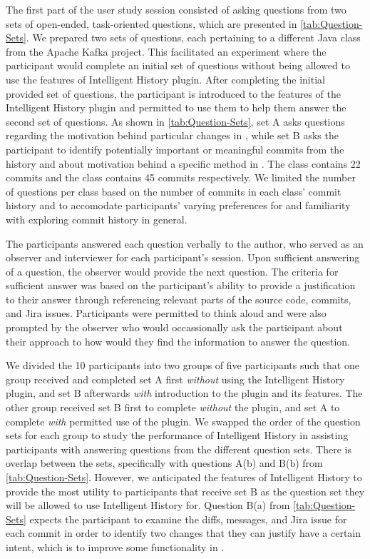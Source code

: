 The first part of the user study session consisted of asking questions from two sets of open-ended, task-oriented questions, which are presented in \autoref{tab:Question-Sets}.
We prepared two sets of questions, each pertaining to a different Java class from the Apache Kafka project.
This facilitated an experiment where the participant would complete an initial set of questions without being allowed to use the features of Intelligent History plugin.
After completing the initial provided set of questions, the participant is introduced to the features of the Intelligent History plugin and permitted to use them to help them answer the second set of questions.
As shown in \autoref{tab:Question-Sets}, set A asks questions regarding the motivation behind particular changes in , while set B asks the participant to identify potentially important or meaningful commits from the history and about motivation behind a specific method in .
The  class contains 22 commits and the  class contains 45 commits respectively.
We limited the number of questions per class based on the number of commits in each class' commit history and to accomodate participants' varying preferences for and familiarity with exploring commit history in general.

The participants answered each question verbally to the author, who served as an observer and interviewer for each participant's session.
Upon sufficient answering of a question, the observer would provide the next question.
The criteria for sufficient answer was based on the participant's ability to provide a justification to their answer through referencing relevant parts of the source code, commits, and Jira issues.
Participants were permitted to think aloud and were also prompted by the observer who would occassionally ask the participant about their approach to how would they find the information to answer the question.

We divided the 10 participants into two groups of five participants such that one group received and completed set A first \emph{without} using the Intelligent History plugin, and set B afterwards \emph{with} introduction to the plugin and its features.
The other group received set B first to complete \emph{without} the plugin, and set A to complete \emph{with} permitted use of the plugin.
We swapped the order of the question sets for each group to study the performance of Intelligent History in assisting participants with answering questions from the different question sets.
There is overlap between the sets, specifically with questions A(b) and B(b) from \autoref{tab:Question-Sets}.
However, we anticipated the features of Intelligent History to provide the most utility to participants that receive set B as the question set they will be allowed to use Intelligent History for.
Question B(a) from \autoref{tab:Question-Sets} expects the participant to examine the diffs, messages, and Jira issue for each commit in order to identify two changes that they can justify have a certain intent, which is to improve some functionality in . 

